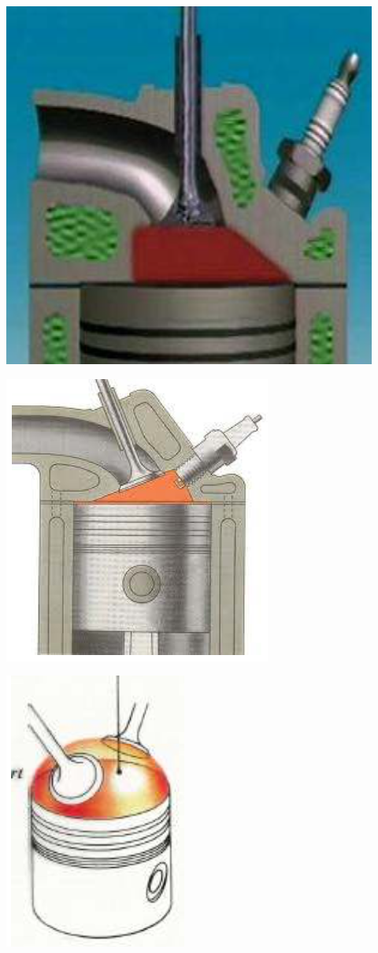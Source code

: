 \begin{center}
\begin{minipage}{0.18 \textwidth}
	\includegraphics[scale=0.3]{ch4/21}
	\end{minipage}
	\begin{minipage}{0.18\textwidth}
	\includegraphics[scale=0.5]{ch4/22}
	\end{minipage}
	\begin{minipage}{0.18\textwidth}
	\includegraphics[scale=0.5]{ch4/23}

\end{minipage}
\end{center}
